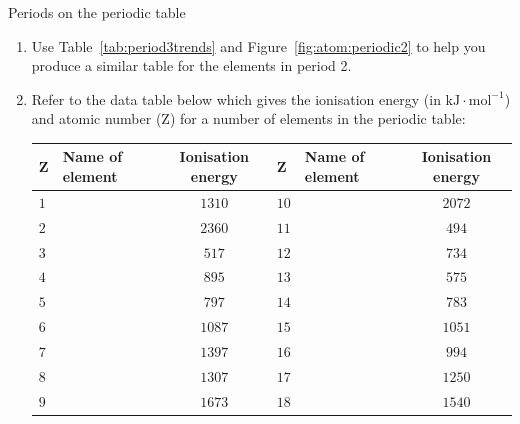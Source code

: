 \begin{exercises}{Periods on the periodic table} \noindent
\begin{enumerate}[noitemsep, label=\textbf{\arabic*}. ]
\item Use Table~\ref{tab:period3trends} and Figure~\ref{fig:atom:periodic2} to help you produce a similar table for the elements in period 2.
\item Refer to the data table below which gives the ionisation energy (in $\text{kJ} \cdot \text{mol}^{-1}$) and atomic number (Z) for a number of elements in the periodic table:\\
\begin{center}
\begin{tabular}{|l|l|c|l|l|c|}\hline
\textbf{Z} & \textbf{Name of element} & \textbf{Ionisation energy} & \textbf{Z} & \textbf{Name of element} & \textbf{Ionisation energy} \\\hline
$1$        &                 & $1310$              & $10$         &                 & $2072$              \\\hline
$2$        &                 & $2360$              & $11$         &                 & $494$               \\\hline
$3$        &                 & $517$               & $12$         &                 & $734$               \\\hline
$4$        &                 & $895$               & $13$         &                 & $575$               \\\hline
$5$        &                 & $797$               & $14$         &                 & $783$               \\\hline
$6$        &                 & $1087$              & $15$         &                 & $1051$              \\\hline
$7$        &                 & $1397$              & $16$         &                 & $994$               \\\hline
$8$        &                 & $1307$              & $17$         &                 & $1250$              \\\hline
$9$        &                 & $1673$              & $18$         &                 & $1540$              \\\hline
\end{tabular}
\end{center}


\end{enumerate}
\end{exercises}
